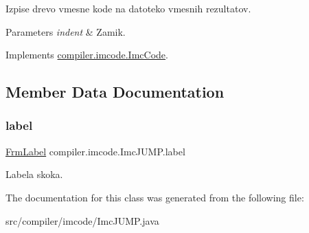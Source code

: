 Izpise drevo vmesne kode na datoteko vmesnih rezultatov.


\begin{DoxyParams}{Parameters}
{\em indent} & Zamik. \\
\hline
\end{DoxyParams}


Implements \hyperlink{interfacecompiler_1_1imcode_1_1_imc_code_a26451dea2ab4dbd7054ac33f4c6d71fe}{compiler.\+imcode.\+Imc\+Code}.



\subsection{Member Data Documentation}
\mbox{\label{classcompiler_1_1imcode_1_1_imc_j_u_m_p_af2af1cea65af445c392fbac3ab4da490}} 
\subsubsection{\texorpdfstring{label}{label}}
{\footnotesize\ttfamily \hyperlink{classcompiler_1_1frames_1_1_frm_label}{Frm\+Label} compiler.\+imcode.\+Imc\+J\+U\+M\+P.\+label}

Labela skoka. 

The documentation for this class was generated from the following file\+:\begin{DoxyCompactItemize}
\item 
src/compiler/imcode/Imc\+J\+U\+M\+P.\+java\end{DoxyCompactItemize}
